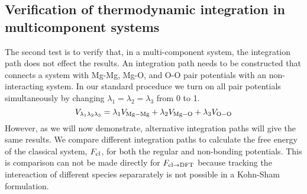 \subsection{Verification of thermodynamic integration in multicomponent
systems}
The second test is to verify that, in a multi-component system, the
integration path does not effect the results. An integration path needs to
be constructed that connects a system with Mg-Mg, Mg-O, and O-O pair
potentials with an non-interacting system. In our standard proceduce we
turn on all pair potentials simultaneously by changing
$\lambda_1=\lambda_2=\lambda_3$ from 0 to 1.
\begin{equation}
  V_{\lambda_1\lambda_2\lambda_3} = \lambda_1 V_{\rm Mg-Mg} + \lambda_2 V_{\rm Mg-O} + \lambda_3 V_{\rm O-O} 
\end{equation}
However, as we will now demonstrate, alternative integration paths will give the same results. We compare different integration paths to calculate
the free energy of the classical system, $F_{\rm cl}$, for both the regular
and non-bonding potentials. This is comparison can not be made directly for
$F_{\rm cl \to DFT}$ because tracking the intereaction of different species
separarately is not possible in a Kohn-Sham formulation.


